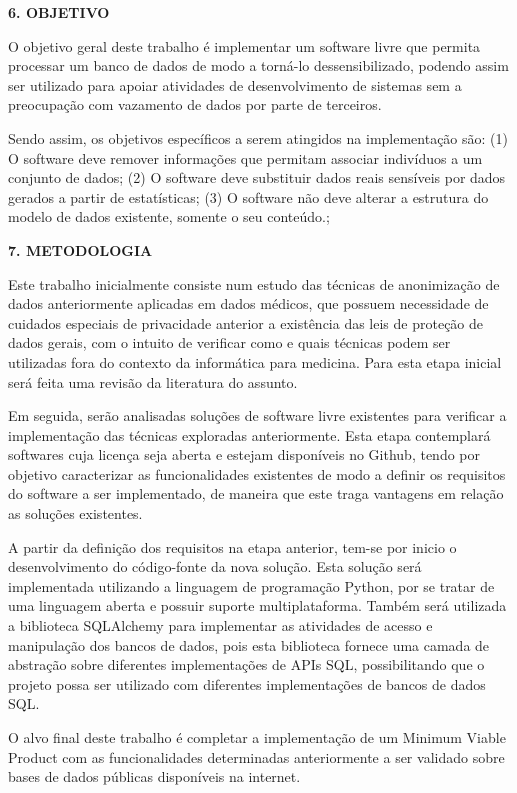 \documentclass[a4paper,12pt,oneside,openany]{report}
\begin{document}
\vspace{0.4cm}
\textbf{6. OBJETIVO}

O objetivo geral deste trabalho é implementar um software livre que permita processar um banco de dados de modo a torná-lo dessensibilizado, podendo assim ser utilizado para apoiar atividades de desenvolvimento de sistemas sem a preocupação com vazamento de dados por parte de terceiros.

Sendo assim, os objetivos específicos a serem atingidos na implementação são: (1) O software deve remover informações que permitam associar indivíduos a um conjunto de dados; (2) O software deve substituir dados reais sensíveis por dados gerados a partir de estatísticas; (3) O software não deve alterar a estrutura do modelo de dados existente, somente o seu conteúdo.;

\vspace{0.4cm}
\textbf{7. METODOLOGIA}

Este trabalho inicialmente consiste num estudo das técnicas de anonimização de dados anteriormente aplicadas em dados médicos, que possuem necessidade de cuidados especiais de privacidade anterior a existência das leis de proteção de dados gerais, com o intuito de verificar como e quais técnicas podem ser utilizadas fora do contexto da informática para medicina. Para esta etapa inicial será feita uma revisão da literatura do assunto.

Em seguida, serão analisadas soluções de software livre existentes para verificar a implementação das técnicas exploradas anteriormente. Esta etapa contemplará softwares cuja licença seja aberta e estejam disponíveis no Github, tendo por objetivo caracterizar as funcionalidades existentes de modo a definir os requisitos do software a ser implementado, de maneira que este traga vantagens em relação as soluções existentes.

A partir da definição dos requisitos na etapa anterior, tem-se por inicio o desenvolvimento do código-fonte da nova solução. Esta solução será implementada utilizando a linguagem de programação Python, por se tratar de uma linguagem aberta e possuir suporte multiplataforma. Também será utilizada a biblioteca SQLAlchemy para implementar as atividades de acesso e manipulação dos bancos de dados, pois esta biblioteca fornece uma camada de abstração sobre diferentes implementações de APIs SQL\cite{sqlalch}, possibilitando que o projeto possa ser utilizado com diferentes implementações de bancos de dados SQL.

O alvo final deste trabalho é completar a implementação de um Minimum Viable Product com as funcionalidades determinadas anteriormente a ser validado sobre bases de dados públicas disponíveis na internet.
\end{document}
